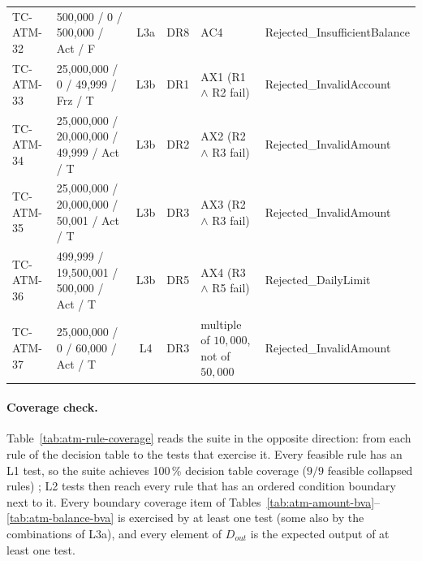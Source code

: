 \documentclass[11pt,a4paper]{article}
\begin{document}
\begin{xltabular}{\textwidth}{@{}l L{4.2cm} c c L{2.7cm} Y@{}}
TC-ATM-32 & 500{,}000 / 0 / 500{,}000 / Act / F & L3a & DR8 & AC4 & Rejected\_InsufficientBalance \\
TC-ATM-33 & 25{,}000{,}000 / 0 / 49{,}999 / Frz / T & L3b & DR1 & AX1 (R1 \(\wedge\) R2 fail) & Rejected\_InvalidAccount \\
TC-ATM-34 & 25{,}000{,}000 / 20{,}000{,}000 / 49{,}999 / Act / T & L3b & DR2 & AX2 (R2 \(\wedge\) R3 fail) & Rejected\_InvalidAmount \\
TC-ATM-35 & 25{,}000{,}000 / 20{,}000{,}000 / 50{,}001 / Act / T & L3b & DR3 & AX3 (R2 \(\wedge\) R3 fail) & Rejected\_InvalidAmount \\
TC-ATM-36 & 499{,}999 / 19{,}500{,}001 / 500{,}000 / Act / T & L3b & DR5 & AX4 (R3 \(\wedge\) R5 fail) & Rejected\_DailyLimit \\
\midrule
TC-ATM-37 & 25{,}000{,}000 / 0 / 60{,}000 / Act / T & L4 & DR3 & multiple of \(10{,}000\), not of \(50{,}000\) & Rejected\_InvalidAmount \\
\end{xltabular}
\endgroup

\paragraph{Coverage check.} Table~\ref{tab:atm-rule-coverage} reads the
suite in the opposite direction: from each rule of the decision table to the
tests that exercise it. Every feasible rule has an L1 test, so the suite
achieves 100\,\% decision table coverage (\(9/9\) feasible collapsed rules)
\cite[\S4.2.3]{istqb}; L2 tests then reach every rule that has an ordered
condition boundary next to it. Every boundary coverage item of
Tables~\ref{tab:atm-amount-bva}--\ref{tab:atm-balance-bva} is exercised by
at least one test (some also by the combinations of L3a), and every element
of \(D_{out}\) is the expected output of at least one test.
\end{document}
